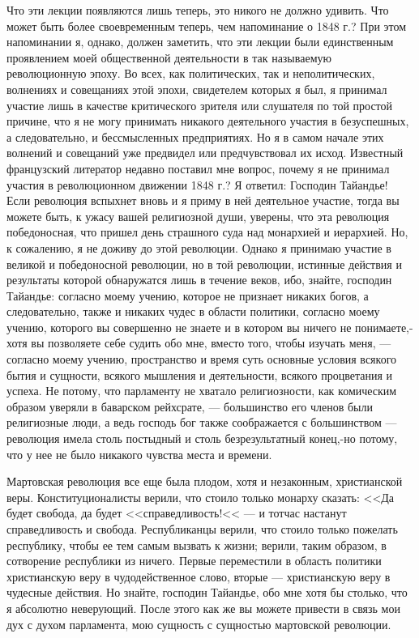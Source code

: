 \documentclass[12pt]{article}
\begin{document}
Что эти лекции появляются лишь теперь, это никого не должно удивить. Что может быть более своевременным теперь, чем напоминание о 1848 г.? При этом напоминании я, однако, должен заметить, что эти лекции были единственным проявлением моей общественной деятельности в так называемую революционную эпоху. Во всех, как политических, так и неполитических, волнениях и совещаниях этой эпохи, свидетелем которых я был, я принимал участие лишь в качестве критического зрителя или слушателя по той простой причине, что я не могу принимать никакого деятельного участия в безуспешных, а следовательно, и бессмысленных предприятиях. Но я в самом начале этих волнений и совещаний уже предвидел или предчувствовал их исход. Известный французский литератор недавно поставил мне вопрос, почему я не принимал участия в революционном движении 1848 г.? Я ответил: Господин Тайандье! Если революция вспыхнет вновь и я приму в ней деятельное участие, тогда вы можете быть, к ужасу вашей религиозной души, уверены, что эта революция победоносная, что пришел день страшного суда над монархией и иерархией. Но, к сожалению, я не доживу до этой революции. Однако я принимаю участие в великой и победоносной революции, но в той революции, истинные действия и результаты которой обнаружатся лишь в течение веков, ибо, знайте, господин Тайандье: согласно моему учению, которое не признает никаких богов, а следовательно, также и никаких чудес в области политики, согласно моему учению, которого вы совершенно не знаете и в котором вы ничего не понимаете,-хотя вы позволяете себе судить обо мне, вместо того, чтобы изучать меня, --- согласно моему учению, пространство и время суть основные условия всякого бытия и сущности, всякого мышления и деятельности, всякого процветания и успеха. Не потому, что парламенту не хватало религиозности, как комическим образом уверяли в баварском рейхсрате, --- большинство его членов были религиозные люди, а ведь господь бог также соображается с большинством --- революция имела столь постыдный и столь безрезультатный конец,-но потому, что у нее не было никакого чувства места и времени. 

Мартовская революция все еще была плодом, хотя и незаконным, христианской веры. Конституционалисты верили, что стоило только монарху сказать: <<Да будет свобода, да будет <<справедливость!<< --- и тотчас настанут справедливость и свобода. Республиканцы верили, что стоило только пожелать республику, чтобы ее тем самым вызвать к жизни; верили, таким образом, в сотворение республики из ничего. Первые переместили в область политики христианскую веру в чудодейственное слово, вторые --- христианскую веру в чудесные действия. Но знайте, господин Тайандье, обо мне хотя бы столько, что я абсолютно неверующий. После этого как же вы можете привести в связь мои дух с духом парламента, мою сущность с сущностью мартовской революции.
\end{document}
